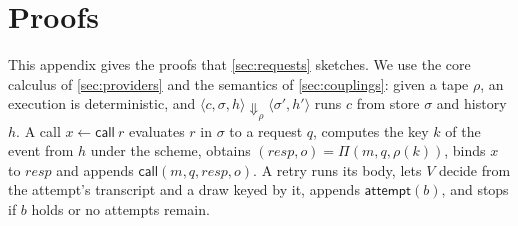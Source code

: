 \section{Proofs}\label{app:proofs}

This appendix gives the proofs that \cref{sec:requests} sketches. We use the core
calculus of \cref{sec:providers} and the semantics of \cref{sec:couplings}: given a tape
$\rho$, an execution is deterministic, and $\langle c, \sigma, h\rangle \Downarrow_\rho
\langle \sigma', h' \rangle$ runs $c$ from store $\sigma$ and history $h$. A call
$x \leftarrow \mathsf{call}\ r$ evaluates $r$ in $\sigma$ to a request $q$, computes the
key $k$ of the event from $h$ under the scheme, obtains $(\mathit{resp}, o) = \Pi(m, q,
\rho(k))$, binds $x$ to $\mathit{resp}$ and appends $\mathsf{call}(m, q, \mathit{resp}, o)$.
A retry runs its body, lets $V$ decide from the attempt's transcript and a draw keyed by
it, appends $\mathsf{attempt}(b)$, and stops if $b$ holds or no attempts remain.

